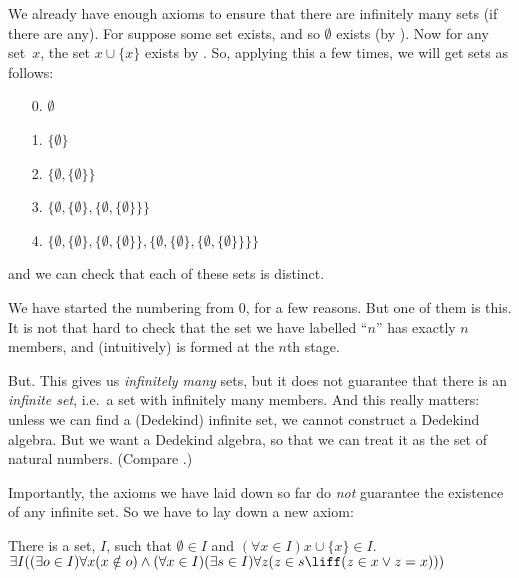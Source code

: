 \documentclass[../../../include/open-logic-section]{subfiles}
\begin{document}

We already have enough axioms to ensure that there are infinitely many
sets (if there are any). For suppose some set exists, and so
$\emptyset$ exists (by ). Now for
any set~$x$, the set $x \cup \{x\}$ exists by
. So, applying this a few
times, we will get sets as follows:
\begin{enumerate}
	\item[0.] $\emptyset$ %
	\item[1.] $ \{\emptyset\}$ %
	\item[2.] $\{\emptyset, \{\emptyset\}\}$ %
	\item[3.] $\{\emptyset, \{\emptyset\}, \{\emptyset, \{\emptyset\}\}\}$ %
	\item[4.] $\{\emptyset, \{\emptyset\}, \{\emptyset, \{\emptyset\}\}, \{\emptyset, \{\emptyset\}, \{\emptyset, \{\emptyset\}\}\}\}$%
\end{enumerate}
and we can check that each of these sets is distinct. 

We have started the numbering from $0$, for a few reasons. But one of
them is this. It is not that hard to check that the set we have
labelled ``$n$'' has exactly $n$ members, and (intuitively) is formed
at the $n$th stage. 

But. This gives us \emph{infinitely many} sets, but it does not
guarantee that there is an \emph{infinite set}, i.e.\ a set with
infinitely many members. And this really matters: unless we can find a
(Dedekind) infinite set, we cannot construct a Dedekind algebra. But
we want a Dedekind algebra, so that we can treat it as the set of
natural numbers. (Compare
.)

Importantly, the axioms we have laid down so far do \emph{not}
guarantee the existence of any infinite set. So we have to lay down a
new axiom:

\begin{axiom}[Infinity]
There is a set, $I$, such that $\emptyset \in I$ and $(\forall x \in I) x \cup \{x\} \in I$.\\
	$\exists I((\exists o \in I)\forall x(x \notin o) \land (\forall x \in I)(\exists s \in I)\forall z(z \in s \liff (z \in x \lor z = x)))$
\end{axiom}
\end{document}

